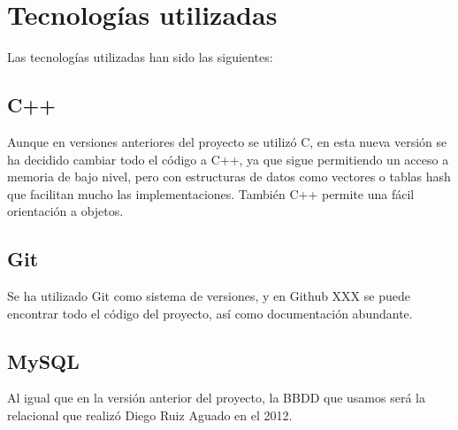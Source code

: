 \section{Tecnologías utilizadas}
Las tecnologías utilizadas han sido las siguientes:
\subsection{C++}
Aunque en versiones anteriores del proyecto se utilizó C, en esta nueva versión se ha decidido cambiar todo el código a C++, ya que sigue permitiendo un acceso a memoria de bajo nivel, pero con estructuras de datos como vectores o tablas hash que facilitan mucho las implementaciones. También C++ permite una fácil orientación a objetos.

\subsection{Git}
Se ha utilizado Git como sistema de versiones, y en Github XXX se puede encontrar todo el código del proyecto, así como documentación abundante.

\subsection{MySQL}
Al igual que en la versión anterior del proyecto, la BBDD que usamos será la relacional que realizó Diego Ruiz Aguado en el 2012.
